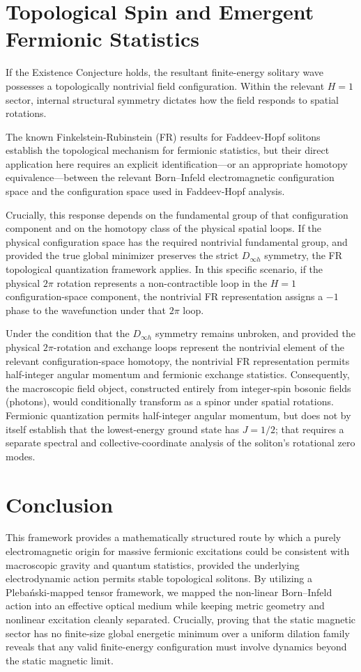 \documentclass[11pt,a4paper]{article}
\begin{document}
\section{Topological Spin and Emergent Fermionic Statistics}
If the Existence Conjecture holds, the resultant finite-energy solitary wave possesses a topologically nontrivial field configuration. Within the relevant $H=1$ sector, internal structural symmetry dictates how the field responds to spatial rotations.

The known Finkelstein-Rubinstein (FR) results for Faddeev-Hopf solitons \cite{Finkelstein1968} establish the topological mechanism for fermionic statistics, but their direct application here requires an explicit identification---or an appropriate homotopy equivalence---between the relevant Born--Infeld electromagnetic configuration space and the configuration space used in Faddeev-Hopf analysis.

Crucially, this response depends on the fundamental group of that configuration component and on the homotopy class of the physical spatial loops. If the physical configuration space has the required nontrivial fundamental group, and provided the true global minimizer preserves the strict $D_{\infty h}$ symmetry, the FR topological quantization framework applies. In this specific scenario, if the physical $2\pi$ rotation represents a non-contractible loop in the $H=1$ configuration-space component, the nontrivial FR representation assigns a $-1$ phase to the wavefunction under that $2\pi$ loop.

Under the condition that the $D_{\infty h}$ symmetry remains unbroken, and provided the physical $2\pi$-rotation and exchange loops represent the nontrivial element of the relevant configuration-space homotopy, the nontrivial FR representation permits half-integer angular momentum and fermionic exchange statistics. Consequently, the macroscopic field object, constructed entirely from integer-spin bosonic fields (photons), would conditionally transform as a spinor under spatial rotations. Fermionic quantization permits half-integer angular momentum, but does not by itself establish that the lowest-energy ground state has $J = 1/2$; that requires a separate spectral and collective-coordinate analysis of the soliton's rotational zero modes.

\section{Conclusion}
This framework provides a mathematically structured route by which a purely electromagnetic origin for massive fermionic excitations could be consistent with macroscopic gravity and quantum statistics, provided the underlying electrodynamic action permits stable topological solitons. By utilizing a Pleba\'{n}ski-mapped tensor framework, we mapped the non-linear Born--Infeld action into an effective optical medium while keeping metric geometry and nonlinear excitation cleanly separated. Crucially, proving that the static magnetic sector has no finite-size global energetic minimum over a uniform dilation family reveals that any valid finite-energy configuration must involve dynamics beyond the static magnetic limit. 
\end{document}
